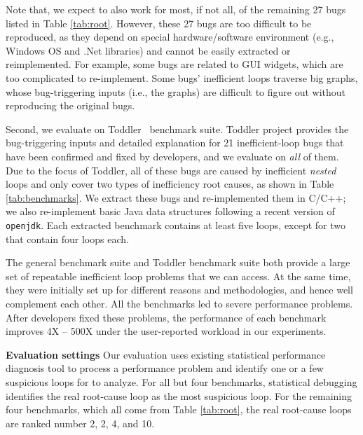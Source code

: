 Note that, we expect \Tool to also work for most, if not all, of 
the remaining 27 bugs listed in Table \ref{tab:root}.
However, these 27 bugs are too difficult to be reproduced, as they 
depend on special hardware/software environment (e.g., Windows OS and 
.Net libraries) and cannot be easily extracted or reimplemented. 
For example, some bugs are related to GUI widgets, which are too complicated to 
re-implement. Some bugs' inefficient 
loops traverse big graphs, whose bug-triggering inputs
(i.e., the graphs) are difficult to figure out 
without reproducing the original bugs. 

Second, we evaluate \Tool on Toddler~\cite{Alabama, toddlerbuglist} benchmark suite.
Toddler project provides the bug-triggering inputs and detailed explanation
for 21 inefficient-loop bugs that have been confirmed and fixed by developers, and
we evaluate \Tool on \emph{all} of them.
Due to the focus of Toddler, all of these bugs are caused by inefficient
\textit{nested} loops and only cover two types of inefficiency root causes,
as shown in Table \ref{tab:benchmarks}.
We extract these bugs and re-implemented them in 
C/C++;
we also re-implement basic Java data structures following a recent version of 
\texttt{openjdk}. Each extracted benchmark contains at least five
loops, except for two that contain four loops each.

The general benchmark suite and Toddler benchmark suite both provide
a large set of repeatable inefficient loop problems that we can access. 
At the same time, they were initially set up for different reasons and
methodologies,
and hence well complement each other.
All the benchmarks led to severe performance problems.
After developers fixed these problems, the performance of each benchmark improves
4X -- 500X under the user-reported workload in our experiments. 


\noindent\textbf{Evaluation settings}
Our evaluation uses existing statistical performance diagnosis
tool \cite{SongOOPSLA2014} to process a performance problem and identify 
one or a few suspicious loops for \Tool to analyze.
For all but four benchmarks, statistical debugging identifies the
real root-cause loop as the most suspicious loop. For the remaining four
benchmarks, which all come from Table \ref{tab:root},
the real root-cause loops are ranked number 2, 2, 4, and 10.


